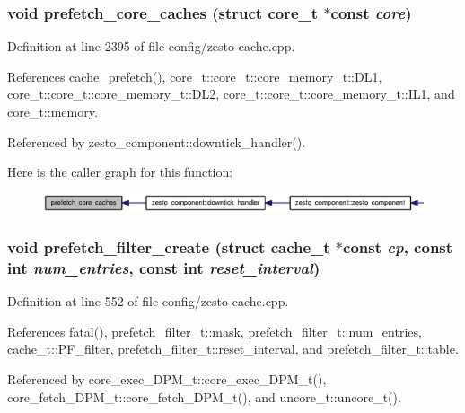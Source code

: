 \subsubsection[{prefetch\_\-core\_\-caches}]{\setlength{\rightskip}{0pt plus 5cm}void prefetch\_\-core\_\-caches (struct {\bf core\_\-t} $\ast$const  {\em core})}\label{zesto-cache_8h_3f3ef48df254425f422f6cf5de128ade}




Definition at line 2395 of file config/zesto-cache.cpp.

References cache\_\-prefetch(), core\_\-t::core\_\-t::core\_\-memory\_\-t::DL1, core\_\-t::core\_\-t::core\_\-memory\_\-t::DL2, core\_\-t::core\_\-t::core\_\-memory\_\-t::IL1, and core\_\-t::memory.

Referenced by zesto\_\-component::downtick\_\-handler().

Here is the caller graph for this function:\nopagebreak
\begin{figure}[H]
\begin{center}
\leavevmode
\includegraphics[width=327pt]{zesto-cache_8h_3f3ef48df254425f422f6cf5de128ade_icgraph}
\end{center}
\end{figure}
\subsubsection[{prefetch\_\-filter\_\-create}]{\setlength{\rightskip}{0pt plus 5cm}void prefetch\_\-filter\_\-create (struct {\bf cache\_\-t} $\ast$const  {\em cp}, \/  const int {\em num\_\-entries}, \/  const int {\em reset\_\-interval})}\label{zesto-cache_8h_81be4d7fbc22a3d9f3fcaa52715c22e9}




Definition at line 552 of file config/zesto-cache.cpp.

References fatal(), prefetch\_\-filter\_\-t::mask, prefetch\_\-filter\_\-t::num\_\-entries, cache\_\-t::PF\_\-filter, prefetch\_\-filter\_\-t::reset\_\-interval, and prefetch\_\-filter\_\-t::table.

Referenced by core\_\-exec\_\-DPM\_\-t::core\_\-exec\_\-DPM\_\-t(), core\_\-fetch\_\-DPM\_\-t::core\_\-fetch\_\-DPM\_\-t(), and uncore\_\-t::uncore\_\-t().

